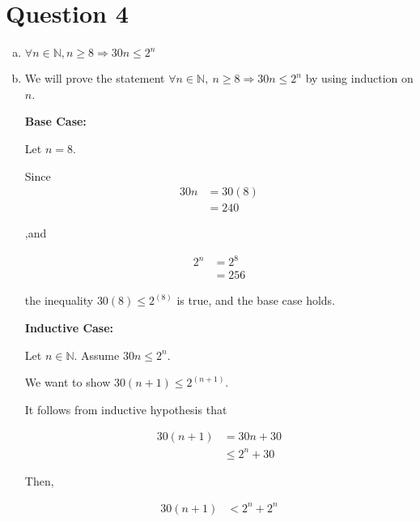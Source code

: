 \documentclass[12pt]{article}
\begin{document}
\section*{Question 4}
\begin{enumerate}[a.]
    \item

    $\forall n \in \mathbb{N}, n \geq 8 \Rightarrow 30n \leq 2^n$

    \item

    We will prove the statement $\forall n \in \mathbb{N},\:n \geq 8 \Rightarrow
    30n \leq 2^n$ by using induction on $n$.

    \bigskip

    \textbf{Base Case:}

    \bigskip

    Let $n=8$.

    \bigskip

    Since
    \setcounter{equation}{0}
    \begin{align}
        30n &= 30(8)\\
        &= 240
    \end{align}

    ,and

    \begin{align}
        2^n &= 2^8\\
        &= 256
    \end{align}

    the inequality $30(8) \leq 2^{(8)}$ is true, and the base case holds.

    \bigskip

    \textbf{Inductive Case:}

    \bigskip

    Let $n \in \mathbb{N}$. Assume $30n \leq 2^n$.

    \bigskip

    We want to show $30(n+1) \leq 2^{(n+1)}$.

    \bigskip

    It follows from inductive hypothesis that

    \begin{align}
        30(n+1) &= 30n + 30\\
        &\leq 2^n + 30
    \end{align}

    \bigskip

    Then,

    \begin{align}
        30(n+1) &< 2^n + 2^n
    \end{align}


\end{enumerate}
\end{document}
